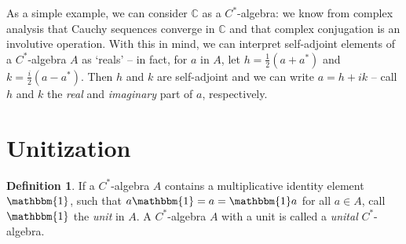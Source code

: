 \documentclass[11pt,a4paper]{report}
\theoremstyle{plain}
\theoremstyle{definition}
\newtheorem*{defn}{Definition}
\newcommand{\1}{\mathbbm{1}}
\newcommand{\C}{\mathbb{C}}
\begin{document}
As a simple example, we can consider $\C$ as a $C^\ast$-algebra: we know from 
complex analysis that Cauchy sequences converge in $\C$ and that complex 
conjugation is an involutive operation. With this in mind, we can interpret 
self-adjoint elements of a $C^\ast$-algebra $A$ as `reals' -- in fact, for $a$ 
in $A$, let $h=\tfrac{1}{2}(a+a^\ast)$ and $k=\tfrac{i}{2}(a-a^\ast)$. Then $h$ 
and $k$ are self-adjoint and we can write $a=h+ik$ -- call $h$ and $k$ the 
\emph{real} and \emph{imaginary} part of $a$, respectively. 

\section{Unitization}\label{section:unit}
\begin{defn}
	If a $C^\ast$-algebra $A$ contains a multiplicative identity element $\1$, such 
	that $a \1 = a = \1  a$ for all $a \in A$, call $\1$ the \emph{unit} in $A$. A 
	$C^\ast$-algebra $A$ with a unit is called a \emph{unital} $C^\ast$-algebra.
\end{defn}
\end{document}
